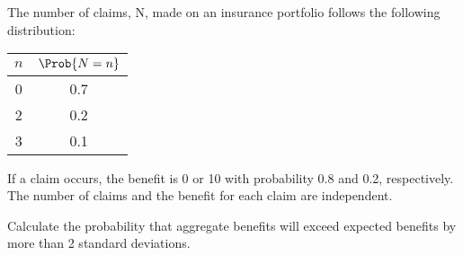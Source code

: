  The number of claims, N, made on an insurance portfolio follows the following
distribution:

\begin{center}\begin{tabular}{|c|c|}\hline
$n$ & $\Prob{N=n}$ \\ \hline
0   & 0.7 \\
2   & 0.2 \\
3   & 0.1 \\ \hline
\end{tabular}\end{center}


If a claim occurs, the benefit is 0 or 10 with probability 0.8 and 0.2, respectively.
The number of claims and the benefit for each claim are independent.

\smallskip
Calculate the probability that aggregate benefits will exceed expected benefits by more
than 2 standard deviations.

